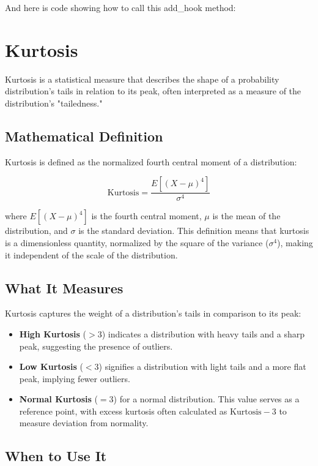 \documentclass[12pt]{article}
\begin{document}
And here is code showing how to call this add\_hook method: 


\section{Kurtosis}

Kurtosis is a statistical measure that describes the shape of a probability distribution's tails in relation to its peak, often interpreted as a measure of the distribution's "tailedness."

\subsection{Mathematical Definition}

Kurtosis is defined as the normalized fourth central moment of a distribution:

\[ \text{Kurtosis} = \frac{E[(X - \mu)^4]}{\sigma^4} \]

where \(E[(X - \mu)^4]\) is the fourth central moment, \(\mu\) is the mean of the distribution, and \(\sigma\) is the standard deviation. This definition means that kurtosis is a dimensionless quantity, normalized by the square of the variance (\(\sigma^4\)), making it independent of the scale of the distribution.

\subsection{What It Measures}

Kurtosis captures the weight of a distribution's tails in comparison to its peak:
\begin{itemize}
    \item \textbf{High Kurtosis} (\(> 3\)) indicates a distribution with heavy tails and a sharp peak, suggesting the presence of outliers.
    \item \textbf{Low Kurtosis} (\(< 3\)) signifies a distribution with light tails and a more flat peak, implying fewer outliers.
    \item \textbf{Normal Kurtosis} (\(= 3\)) for a normal distribution. This value serves as a reference point, with excess kurtosis often calculated as \(\text{Kurtosis} - 3\) to measure deviation from normality.
\end{itemize}

\subsection{When to Use It}
\end{document}
